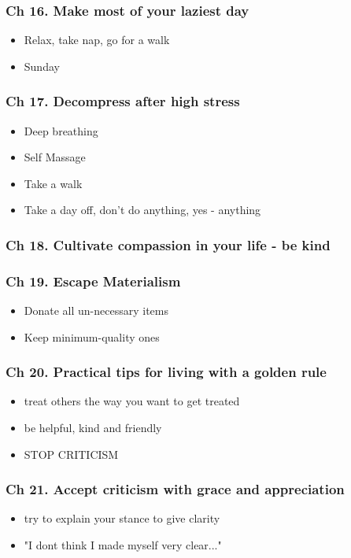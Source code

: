 \begin{frame}[fragile]
\frametitle{Ch 16. Make most of your laziest day}
\begin{itemize}
\item Relax, take nap, go for a walk
\item Sunday
\end{itemize}
\end{frame}

\begin{frame}[fragile]
\frametitle{Ch 17. Decompress after high stress}
\begin{itemize}
\item Deep breathing
\item Self Massage
\item Take a walk
\item Take a day off, don't do anything, yes - anything
\end{itemize}
\end{frame}

\begin{frame}[fragile]
\frametitle{Ch 18. Cultivate compassion in your life - be kind}
\end{frame}

\begin{frame}[fragile]
\frametitle{Ch 19. Escape Materialism}
\begin{itemize}
\item Donate all un-necessary items
\item Keep minimum-quality ones
\end{itemize}
\end{frame}

\begin{frame}[fragile]
\frametitle{Ch 20. Practical tips for living with a golden rule}
\begin{itemize}
\item treat others the way you want to get treated
\item be helpful, kind and friendly
\item STOP CRITICISM
\end{itemize}
\end{frame}

\begin{frame}[fragile]
\frametitle{Ch 21. Accept criticism with grace and appreciation}
\begin{itemize}
\item try to explain your stance to give clarity
\item "I dont think I made myself very clear..."
\end{itemize}
\end{frame}

